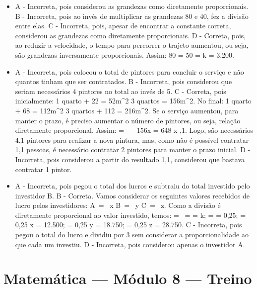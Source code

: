 \begin{itemize}
\item A - Incorreta, pois considerou as grandezas como diretamente
proporcionais.
B - Incorreta, pois ao invés de multiplicar as grandezas 80 e 40, fez a
divisão entre elas.
C - Incorreta, pois, apesar de encontrar a constante correta, considerou
as grandezas como diretamente proporcionais.
D - Correta, pois, ao reduzir a velocidade, o tempo para percorrer o
trajeto aumentou, ou seja, são grandezas inversamente proporcionais.
Assim: 80  = 50  = k = 3.200.
\item A - Incorreta, pois colocou o total de pintores para concluir o serviço
e não quantos tinham que ser contratados.
B - Incorreta, pois considerou que seriam necessários 4 pintores no
total ao invés de 5.
C - Correta, pois inicialmente: 1 quarto  + 22 = 52m^{2} 3 quartos
  = 156m^{2}. No final: 1 quarto  + 68 = 112m^{2} 3 quartos   + 112 = 216m^{2}. Se o serviço aumentou, para manter o prazo, é preciso aumentar o número de pintores, ou seja, relação diretamente proporcional. Assim:  = \  \rightarrow \ \ 156x = 648 \rightarrow x ,1. Logo, são necessários 4,1 pintores para realizar a nova pintura, mas, como não é possível contratar 1,1 pessoas, é necessário contratar 2
pintores para manter o prazo inicial.
D - Incorreta, pois considerou a partir do resultado 1,1, considerou que
bastava contratar 1 pintor.
\item A - Incorreta, pois pegou o total dos lucros e subtraiu do total
investido pelo investidor B.
B - Correta. Vamos considerar os seguintes valores recebidos de lucro pelos
investidores: A\  = \ x\; B\  = \ y C\  = \ z. Como a divisão é diretamente proporcional ao valor investido, temos:  = \  =  = k;  =  = 0,25;  = 0,25 \rightarrow x = 12.500;  = 0,25 \rightarrow y = 18.750;  = 0,25 \rightarrow z = 28.750. 
C - Incorreta, pois pegou o total do lucro e dividiu por 3 sem
considerar a proporcionalidade ao que cada um investiu.
D - Incorreta, pois considerou apenas o investidor A.
\end{itemize}

\section*{Matemática — Módulo 8 — Treino}

